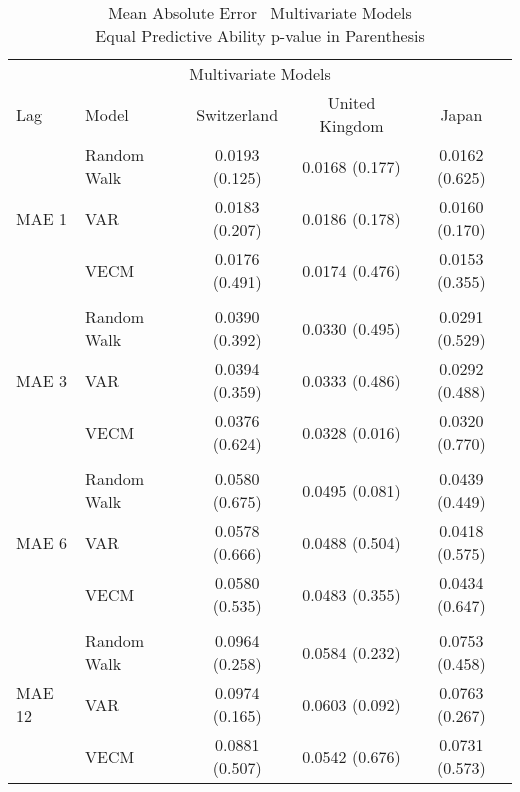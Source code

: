 \begin{table}[!h] %
  \centering
  \caption[MAE \textendash \ Multivariate Models]{Mean Absolute Error \textendash \ Multivariate Models \\
           Equal Predictive Ability p-value in Parenthesis}
  \begin{tabular}{llccc} %
    \toprule
    \multicolumn{5}{c}{Multivariate Models}                      \\
    \cmidrule(r){1-5}
    Lag                           &   Model                                     &Switzerland       & United Kingdom & Japan\\
    \midrule
    \multirow{3}{*}{MAE 1}        & \multicolumn{1}{l}{Random Walk}             &   0.0193 (0.125) & 0.0168 (0.177) & 0.0162 (0.625)\\  
                                  & \multicolumn{1}{l}{VAR}                     &   0.0183 (0.207) & 0.0186 (0.178) & 0.0160 (0.170)\\ 
                                  & \multicolumn{1}{l}{VECM}                    &   0.0176 (0.491) & 0.0174 (0.476) & 0.0153 (0.355)\\
    \\
    \multirow{3}{*}{MAE 3}        & \multicolumn{1}{l}{Random Walk}             &   0.0390 (0.392) & 0.0330 (0.495) & 0.0291 (0.529)\\ 
                                  & \multicolumn{1}{l}{VAR}                     &   0.0394 (0.359) & 0.0333 (0.486) & 0.0292 (0.488)\\
                                  & \multicolumn{1}{l}{VECM}                    &   0.0376 (0.624) & 0.0328 (0.016) & 0.0320 (0.770)\\
                                                                             
    \\
    \multirow{3}{*}{MAE 6}        & \multicolumn{1}{l}{Random Walk}             &   0.0580 (0.675) & 0.0495 (0.081) & 0.0439 (0.449)\\
                                  & \multicolumn{1}{l}{VAR}                     &   0.0578 (0.666) & 0.0488 (0.504) & 0.0418 (0.575)\\
                                  & \multicolumn{1}{l}{VECM}                    &   0.0580 (0.535) & 0.0483 (0.355) & 0.0434 (0.647)\\
     \\
    \multirow{3}{*}{MAE 12}       & \multicolumn{1}{l}{Random Walk}             &   0.0964 (0.258) & 0.0584 (0.232) & 0.0753 (0.458)\\
                                  & \multicolumn{1}{l}{VAR}                     &   0.0974 (0.165) & 0.0603 (0.092) & 0.0763 (0.267)\\
                                  & \multicolumn{1}{l}{VECM}                    &   0.0881 (0.507) & 0.0542 (0.676) & 0.0731 (0.573)\\
    \bottomrule
  \end{tabular}
  \label{table:MAEmultivariate}
  \vspace{1em}  
\end{table}

